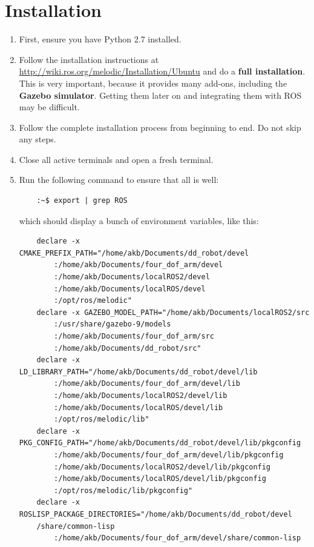 \documentclass{article}
\begin{document}
    \section{Installation}
        \begin{enumerate}
            \item First, ensure you have Python 2.7 installed.
            \item Follow the installation instructions at \url{http://wiki.ros.org/melodic/Installation/Ubuntu}
            and do a \textbf{full installation}. This is very important, because it provides 
            many add-ons, including the \textbf{Gazebo simulator}. Getting them 
            later on and integrating them with ROS may be difficult.
            \item Follow the complete installation process from beginning to end. Do not skip any steps.
            \item Close all active terminals and open a fresh terminal.
            \item Run the following command to ensure that all is well:
            \begin{verbatim}
    :~$ export | grep ROS
            \end{verbatim}
            which should display a bunch of environment variables, like this:
            \begin{verbatim}
    declare -x CMAKE_PREFIX_PATH="/home/akb/Documents/dd_robot/devel
        :/home/akb/Documents/four_dof_arm/devel
        :/home/akb/Documents/localROS2/devel
        :/home/akb/Documents/localROS/devel
        :/opt/ros/melodic"
    declare -x GAZEBO_MODEL_PATH="/home/akb/Documents/localROS2/src
        :/usr/share/gazebo-9/models
        :/home/akb/Documents/four_dof_arm/src
        :/home/akb/Documents/dd_robot/src"
    declare -x LD_LIBRARY_PATH="/home/akb/Documents/dd_robot/devel/lib
        :/home/akb/Documents/four_dof_arm/devel/lib
        :/home/akb/Documents/localROS2/devel/lib
        :/home/akb/Documents/localROS/devel/lib
        :/opt/ros/melodic/lib"
    declare -x PKG_CONFIG_PATH="/home/akb/Documents/dd_robot/devel/lib/pkgconfig
        :/home/akb/Documents/four_dof_arm/devel/lib/pkgconfig
        :/home/akb/Documents/localROS2/devel/lib/pkgconfig
        :/home/akb/Documents/localROS/devel/lib/pkgconfig
        :/opt/ros/melodic/lib/pkgconfig"
    declare -x ROSLISP_PACKAGE_DIRECTORIES="/home/akb/Documents/dd_robot/devel
    /share/common-lisp
        :/home/akb/Documents/four_dof_arm/devel/share/common-lisp

\end{verbatim}
\end{enumerate}
\end{document}
